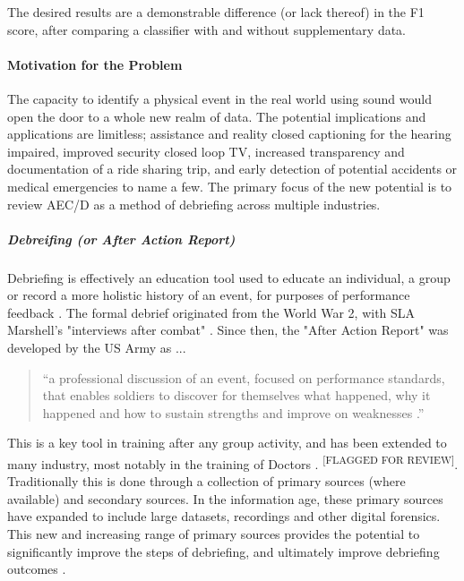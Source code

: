 \documentclass{UoNMCHA}
\newcommand{\flagforreview}{\textsuperscript{\color{red} [FLAGGED FOR REVIEW]}}
\newcommand{\inlineQuote}[1]{``#1''}
\newcommand{\fancyquote}[1]{\begin{quotation}\inlineQuote{#1}\end{quotation}}
\numberwithin{equation}{section}
\begin{document}
The desired results are a demonstrable difference (or lack thereof) in the F1 score, after comparing a classifier with and without supplementary data.

\paragraph{Motivation for the Problem}
The capacity to identify a physical event in the real world using sound would open the door to a whole new realm of data. The potential implications and applications are limitless; assistance and reality closed captioning for the hearing impaired, improved security closed loop TV, increased transparency and documentation of a ride sharing trip, and early detection of potential accidents or medical emergencies to name a few. The primary focus of the new potential is to review AEC/D as a method of debriefing across multiple industries. \\

\subparagraph{Debreifing (or After Action Report)}

Debriefing is effectively an education tool used to educate an individual, a group or record a more holistic history of an event, for purposes of performance feedback \cite{recentAAR}.
The formal debrief originated from the World War 2, with SLA Marshell's "interviews after combat" \cite{DebriefAAR}. Since then, the "After Action Report" was developed by the US Army as ...
\fancyquote{a professional discussion of an event, focused on performance standards, that enables soldiers to discover for themselves what happened, why it happened and how to sustain strengths and improve on weaknesses \cite{TC2520}.}
This is a key tool in training after any group activity, and has been extended to many industry, most notably in the training of Doctors \cite{johnson2011debriefing}.\flagforreview. Traditionally this is done through a collection of primary sources (where available) and secondary sources. In the information age, these primary sources have expanded to include large datasets, recordings and other digital forensics. This new and increasing range of primary sources provides the potential to significantly improve the steps of debriefing, and ultimately improve debriefing outcomes \cite{PsychologicalDebriefing2012}.
\end{document}
